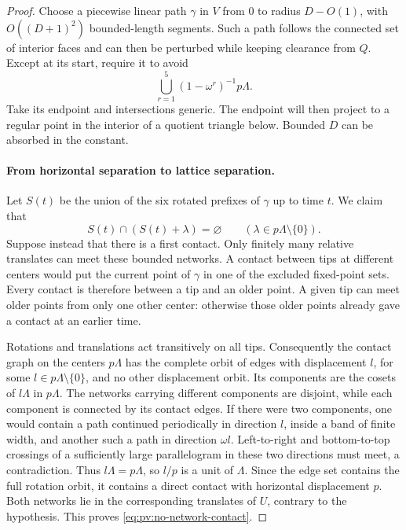 \begin{proof}
Choose a piecewise linear path \(\gamma\) in \(V\) from 0 to radius
\(D-O(1)\), with \(O((D+1)^2)\) bounded-length segments. Such a path follows
the connected set of interior faces and can then be perturbed while keeping
clearance from \(Q\). Except at its start, require it to avoid
\[
 \bigcup_{r=1}^5(1-\omega^r)^{-1}p\Lambda.
\]
Take its endpoint and intersections generic. The endpoint will then project
to a regular point in the interior of a quotient triangle below. Bounded
\(D\) can be absorbed in the constant.

\paragraph{From horizontal separation to lattice separation.}
Let \(S(t)\) be the union of the six rotated prefixes of \(\gamma\) up to
time \(t\). We claim that
\begin{equation}\label{eq:pv:no-network-contact}
 S(t)\cap(S(t)+\lambda)=\varnothing
 \qquad(\lambda\in p\Lambda\setminus\{0\}).
\end{equation}
Suppose instead that there is a first contact. Only finitely many relative
translates can meet these bounded networks. A contact between tips at
different centers would put the current point of \(\gamma\) in one of the
excluded fixed-point sets. Every contact is therefore between a tip and an
older point. A given tip can meet older points from only one other center:
otherwise those older points already gave a contact at an earlier time.

Rotations and translations act transitively on all tips. Consequently the
contact graph on the centers \(p\Lambda\) has the complete orbit of edges
with displacement \(l\), for some \(l\in p\Lambda\setminus\{0\}\), and
no other displacement orbit. Its components are the cosets of \(l\Lambda\)
in \(p\Lambda\). The networks carrying different components are disjoint,
while each component is connected by its contact edges. If there were two
components, one would contain a path continued periodically in direction
\(l\), inside a band of finite width, and another such a path in direction
\(\omega l\). Left-to-right and bottom-to-top crossings of a sufficiently
large parallelogram in these two directions must meet, a contradiction.
Thus \(l\Lambda=p\Lambda\), so \(l/p\) is a unit of \(\Lambda\). Since
the edge set contains the full rotation orbit, it contains a direct contact
with horizontal displacement \(p\). Both networks lie in the corresponding
translates of \(U\), contrary to the hypothesis. This proves
\eqref{eq:pv:no-network-contact}.


\end{proof}
